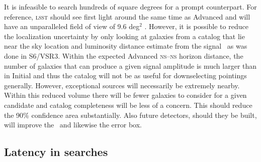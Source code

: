 It is infeasible to search hundreds of square degrees for a prompt counterpart.
For reference, \textsc{lsst} should see first light around the same time as
Advanced \LIGO{} and will have an unparalleled field of view of 9.6 deg$^2$
\citep{2008arXiv0805.2366I}.  However, 
it is possible to reduce the localization uncertainty by only looking at
galaxies from a catalog that lie near the sky location and luminosity distance
estimate from the \GW{} signal~\citep{galaxy-catalog} as was done in S6/VSR3.
Within the expected Advanced \LIGO{} \textsc{ns}--\textsc{ns} horizon distance,
the number of galaxies that can produce a given signal amplitude is much larger
than in Initial \LIGO{} and thus the catalog will not be as useful
for downselecting pointings generally. However, exceptional \GW{} sources will
necessarily be extremely nearby. Within this reduced volume there will be fewer
galaxies to consider for a given candidate and catalog completeness will be
less of a concern.  This should reduce the 90\% confidence area substantially.
Also future \GW{} detectors, should they be built, will improve the \SNR\ and
likewise the error box.

\subsection{Latency in \CBC{} searches}

